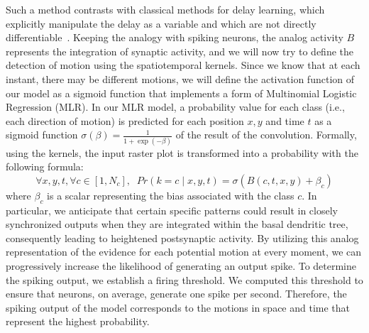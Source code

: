 \documentclass[default]{sn-jnl}%
\theoremstyle{thmstyleone}%
\theoremstyle{thmstyletwo}%
\theoremstyle{thmstylethree}%
\newcommand{\bias}{\beta} %
\newcommand{\timev}{t} %
\newcommand{\class}{c} %
\newcommand{\Nclass}{N_\class} %
\begin{document}
Such a method contrasts with classical methods for delay learning, which explicitly manipulate the delay as a variable and which are not directly differentiable~\citep{nadafian_bio-plausible_2020}. Keeping the analogy with spiking neurons, the analog activity $B$ represents the integration of synaptic activity, and we will now try to define the detection of motion using the spatiotemporal kernels. Since we know that at each instant, there may be different motions, we will define the activation function of our model as a sigmoid function that implements a form of Multinomial Logistic Regression (MLR). In our MLR model, a probability value for each class (i.e., each direction of motion) is predicted for each position $x, y$ and time $\timev$ as a sigmoid function $\sigma(\beta) = \frac {1} {1 + \exp(-\beta)}$ of the result of the convolution. Formally, using the kernels, the input raster plot is transformed into a probability with the following formula:
%
\begin{equation}\label{eq:mlr}
\forall x, y, \timev, \forall \class \in [1, \Nclass], \; \;
Pr(k=\class \; \vert \; x, y, \timev) =
\sigma (B(\class, \timev, x, y) +\bias_\class) 
\end{equation} 
%
where $\bias_\class$ is a scalar representing the bias associated with the class $\class$. In particular, we anticipate that certain specific patterns could result in closely synchronized outputs when they are integrated within the basal dendritic tree, consequently leading to heightened postsynaptic activity. By utilizing this analog representation of the evidence for each potential motion at every moment, we can progressively increase the likelihood of generating an output spike. To determine the spiking output, we establish a firing threshold. We computed this threshold to ensure that neurons, on average, generate one spike per second. Therefore, the spiking output of the model corresponds to the motions in space and time that represent the highest probability.
\end{document}
